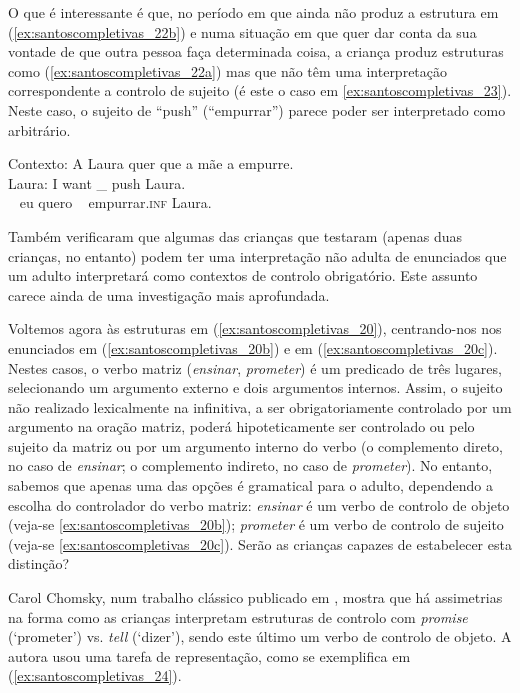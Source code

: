\documentclass[output=paper]{LSP/langsci}
\begin{document}
O que é interessante é que, no período em que ainda não produz a estrutura em (\ref{ex:santoscompletivas_22b}) e numa situação em que quer dar conta da sua vontade de que outra pessoa faça determinada coisa, a criança produz estruturas como (\ref{ex:santoscompletivas_22a}) mas que não têm uma interpretação correspondente a controlo de sujeito (é este o caso em \ref{ex:santoscompletivas_23}). Neste caso, o sujeito de ``push'' (``empurrar'') parece poder ser interpretado como arbitrário. 

\ea\label{ex:santoscompletivas_23}
Contexto: A Laura quer que a mãe a empurre.\\
\gll Laura: I want \_ push Laura.\\
{~} eu quero ~ empurrar.\textsc{inf} Laura.\\
\z

Também \citet{mcdaniel_etal1990} verificaram que algumas das crianças que testaram (apenas duas crianças, no entanto) podem ter uma interpretação não adulta de enunciados que um adulto interpretará como contextos de controlo obrigatório. Este assunto carece ainda de uma investigação mais aprofundada.

Voltemos agora às estruturas em (\ref{ex:santoscompletivas_20}), centrando-nos nos enunciados em (\ref{ex:santoscompletivas_20b}) e em (\ref{ex:santoscompletivas_20c}). Nestes casos, o verbo matriz (\textit{ensinar}, \textit{prometer}) é um predicado de três lugares, selecionando um argumento externo e dois argumentos internos. Assim, o sujeito não realizado lexicalmente na infinitiva, a ser obrigatoriamente controlado por um argumento na oração matriz, poderá hipoteticamente ser controlado ou pelo sujeito da matriz ou por um argumento interno do verbo (o complemento direto, no caso de \textit{ensinar}; o complemento indireto, no caso de \textit{prometer}). No entanto, sabemos que apenas uma das opções é gramatical para o adulto, dependendo a escolha do controlador do verbo matriz: \textit{ensinar} é um verbo de controlo de objeto (veja-se \ref{ex:santoscompletivas_20b}); \textit{prometer} é um verbo de controlo de sujeito (veja-se \ref{ex:santoscompletivas_20c}). Serão as crianças capazes de estabelecer esta distinção?

Carol Chomsky, num trabalho clássico publicado em \citeyear{chomsky1969}, mostra que há assimetrias na forma como as crianças interpretam estruturas de controlo com \textit{promise} (‘prometer’) vs. \textit{tell} (‘dizer’), sendo este último um verbo de controlo de objeto. A autora usou uma tarefa de representação, como se exemplifica em (\ref{ex:santoscompletivas_24}).
\end{document}
